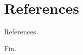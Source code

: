 \section*{References}
{\tiny
\begin{frame}[allowframebreaks]{References}
  
  
\end{frame}
}
\begin{frame}
  \begin{center}
    \LARGE{Fin.}
  \end{center}
\end{frame}


